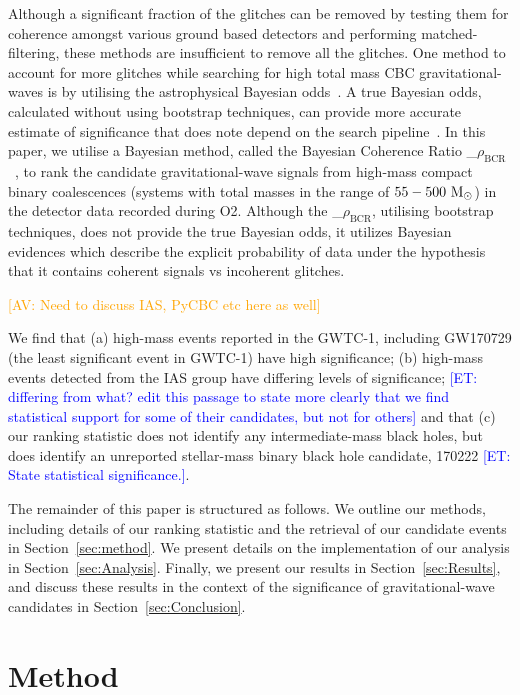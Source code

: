 \documentclass[%
 nofootinbib,
 amsmath,amssymb,
 aps,
 twocolumn
]{revtex4-2}
\newcommand{\mathcmd}[1]{{\sc \relax\ifmmode#1\else $#1$\fi}\xspace}
\newcommand{\bcr}{\mathcmd{\rho_\text{BCR}}}
\newcommand{\msun}{\mathcmd{\text{M}_\odot}}
\newcommand{\avi}[1]{\textcolor{orange}{[AV: #1]}}
\newcommand{\et}[1]{\textcolor{blue}{[ET: #1]}}
\begin{document}
Although a significant fraction of the glitches can be removed by testing them for coherence amongst various ground based detectors and performing matched-filtering, these methods are insufficient to remove all the glitches. One method to account for more glitches while searching for high total mass CBC gravitational-waves is by utilising the astrophysical Bayesian odds~\cite{bci, BCR1, BCR2, bcr_gw151216, bayesian_odds}. A true Bayesian odds, calculated without using bootstrap techniques, can provide more accurate estimate of significance that does note depend on the search pipeline~\cite{BCR2, bcr_gw151216,  bayesian_odds}. In this paper, we utilise a Bayesian method, called the Bayesian Coherence Ratio \bcr~\cite{BCR1}, to rank the candidate gravitational-wave signals from high-mass compact binary coalescences (systems with total masses in the range of $55-500\ \msun$) in the detector data recorded during O2. Although the \bcr, utilising bootstrap techniques, does not provide the true Bayesian odds,  it utilizes Bayesian evidences which describe the explicit probability of data under the hypothesis that it contains coherent signals vs incoherent glitches.


\avi{Need to discuss IAS, PyCBC etc here as well}

We find that (a) high-mass events reported in the GWTC-1, including GW170729 (the least significant event in GWTC-1) have high significance; (b) high-mass events detected from the IAS group have differing levels of significance; \et{differing from what? edit this passage to state more clearly that we find statistical support for some of their candidates, but not for others} and that (c) our ranking statistic does not identify any intermediate-mass black holes, but does identify an unreported stellar-mass binary black hole candidate, 170222 \et{State statistical significance.}.

The remainder of this paper is structured as follows. We outline our methods, including details of our ranking statistic and the retrieval of our candidate events in Section~\ref{sec:method}. We present details on the implementation of our analysis in Section~\ref{sec:Analysis}. Finally, we present our results in Section~\ref{sec:Results}, and discuss these results in the context of the significance of gravitational-wave candidates in Section~\ref{sec:Conclusion}.



\section{Method\label{sec:method}}
\end{document}

